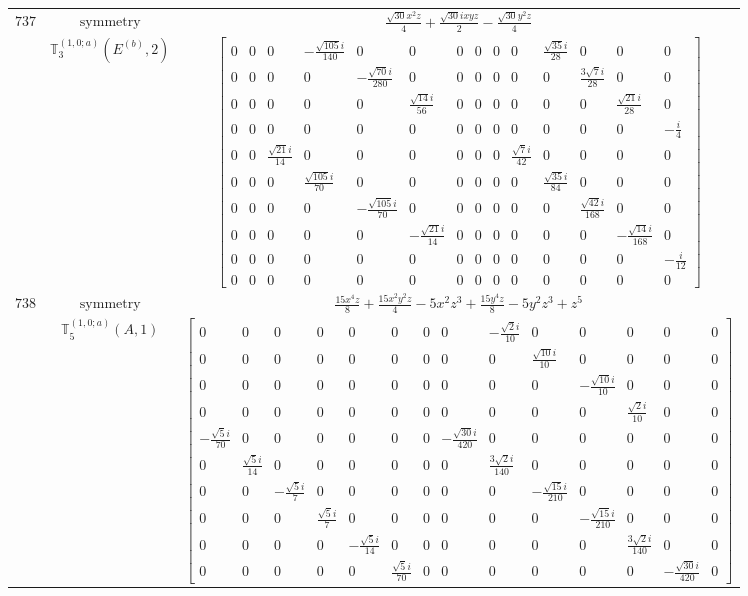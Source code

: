 \documentclass[fleqn,8pt,landscape]{jsarticle}
\begin{document}
\begin{longtable}{ccc}
$ 737 $ & $ \text{symmetry} $ & $ \frac{\sqrt{30} x^{2} z}{4} + \frac{\sqrt{30} i x y z}{2} - \frac{\sqrt{30} y^{2} z}{4} $ \\
$  $ & $ \mathbb{T}_{3}^{(1,0;a)}(E^{(b)},2) $ & $ \begin{bmatrix} 0 & 0 & 0 & - \frac{\sqrt{105} i}{140} & 0 & 0 & 0 & 0 & 0 & 0 & \frac{\sqrt{35} i}{28} & 0 & 0 & 0 \\ 0 & 0 & 0 & 0 & - \frac{\sqrt{70} i}{280} & 0 & 0 & 0 & 0 & 0 & 0 & \frac{3 \sqrt{7} i}{28} & 0 & 0 \\ 0 & 0 & 0 & 0 & 0 & \frac{\sqrt{14} i}{56} & 0 & 0 & 0 & 0 & 0 & 0 & \frac{\sqrt{21} i}{28} & 0 \\ 0 & 0 & 0 & 0 & 0 & 0 & 0 & 0 & 0 & 0 & 0 & 0 & 0 & - \frac{i}{4} \\ 0 & 0 & \frac{\sqrt{21} i}{14} & 0 & 0 & 0 & 0 & 0 & 0 & \frac{\sqrt{7} i}{42} & 0 & 0 & 0 & 0 \\ 0 & 0 & 0 & \frac{\sqrt{105} i}{70} & 0 & 0 & 0 & 0 & 0 & 0 & \frac{\sqrt{35} i}{84} & 0 & 0 & 0 \\ 0 & 0 & 0 & 0 & - \frac{\sqrt{105} i}{70} & 0 & 0 & 0 & 0 & 0 & 0 & \frac{\sqrt{42} i}{168} & 0 & 0 \\ 0 & 0 & 0 & 0 & 0 & - \frac{\sqrt{21} i}{14} & 0 & 0 & 0 & 0 & 0 & 0 & - \frac{\sqrt{14} i}{168} & 0 \\ 0 & 0 & 0 & 0 & 0 & 0 & 0 & 0 & 0 & 0 & 0 & 0 & 0 & - \frac{i}{12} \\ 0 & 0 & 0 & 0 & 0 & 0 & 0 & 0 & 0 & 0 & 0 & 0 & 0 & 0 \end{bmatrix} $ \\ \hline
$ 738 $ & $ \text{symmetry} $ & $ \frac{15 x^{4} z}{8} + \frac{15 x^{2} y^{2} z}{4} - 5 x^{2} z^{3} + \frac{15 y^{4} z}{8} - 5 y^{2} z^{3} + z^{5} $ \\
$  $ & $ \mathbb{T}_{5}^{(1,0;a)}(A,1) $ & $ \begin{bmatrix} 0 & 0 & 0 & 0 & 0 & 0 & 0 & 0 & - \frac{\sqrt{2} i}{10} & 0 & 0 & 0 & 0 & 0 \\ 0 & 0 & 0 & 0 & 0 & 0 & 0 & 0 & 0 & \frac{\sqrt{10} i}{10} & 0 & 0 & 0 & 0 \\ 0 & 0 & 0 & 0 & 0 & 0 & 0 & 0 & 0 & 0 & - \frac{\sqrt{10} i}{10} & 0 & 0 & 0 \\ 0 & 0 & 0 & 0 & 0 & 0 & 0 & 0 & 0 & 0 & 0 & \frac{\sqrt{2} i}{10} & 0 & 0 \\ - \frac{\sqrt{5} i}{70} & 0 & 0 & 0 & 0 & 0 & 0 & - \frac{\sqrt{30} i}{420} & 0 & 0 & 0 & 0 & 0 & 0 \\ 0 & \frac{\sqrt{5} i}{14} & 0 & 0 & 0 & 0 & 0 & 0 & \frac{3 \sqrt{2} i}{140} & 0 & 0 & 0 & 0 & 0 \\ 0 & 0 & - \frac{\sqrt{5} i}{7} & 0 & 0 & 0 & 0 & 0 & 0 & - \frac{\sqrt{15} i}{210} & 0 & 0 & 0 & 0 \\ 0 & 0 & 0 & \frac{\sqrt{5} i}{7} & 0 & 0 & 0 & 0 & 0 & 0 & - \frac{\sqrt{15} i}{210} & 0 & 0 & 0 \\ 0 & 0 & 0 & 0 & - \frac{\sqrt{5} i}{14} & 0 & 0 & 0 & 0 & 0 & 0 & \frac{3 \sqrt{2} i}{140} & 0 & 0 \\ 0 & 0 & 0 & 0 & 0 & \frac{\sqrt{5} i}{70} & 0 & 0 & 0 & 0 & 0 & 0 & - \frac{\sqrt{30} i}{420} & 0 \end{bmatrix} $ \\ \hline

\end{longtable}
\end{document}
